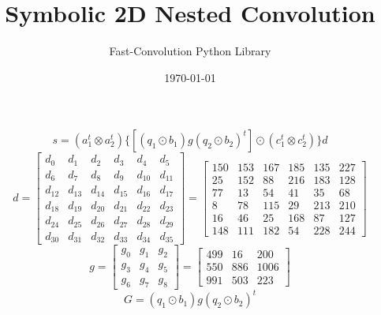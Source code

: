 \documentclass{article}%
\title{Symbolic 2D Nested Convolution}%
\author{Fast{-}Convolution Python Library}%
\date{\today}%
\begin{document}
%
\normalsize%
\maketitle%
\[%
s=(a_1^t \otimes a_2^t) \{[(q_1 \odot b_1) g (q_2 \odot b_2)^t] \odot (c_1^t \otimes c_2^t)\} d%
\]%
\[%
d = \left[\begin{matrix}d_{0} & d_{1} & d_{2} & d_{3} & d_{4} & d_{5}\\d_{6} & d_{7} & d_{8} & d_{9} & d_{10} & d_{11}\\d_{12} & d_{13} & d_{14} & d_{15} & d_{16} & d_{17}\\d_{18} & d_{19} & d_{20} & d_{21} & d_{22} & d_{23}\\d_{24} & d_{25} & d_{26} & d_{27} & d_{28} & d_{29}\\d_{30} & d_{31} & d_{32} & d_{33} & d_{34} & d_{35}\end{matrix}\right] = \left[\begin{matrix}150 & 153 & 167 & 185 & 135 & 227\\25 & 152 & 88 & 216 & 183 & 128\\77 & 13 & 54 & 41 & 35 & 68\\8 & 78 & 115 & 29 & 213 & 210\\16 & 46 & 25 & 168 & 87 & 127\\148 & 111 & 182 & 54 & 228 & 244\end{matrix}\right]%
\]%
\[%
g = \left[\begin{matrix}g_{0} & g_{1} & g_{2}\\g_{3} & g_{4} & g_{5}\\g_{6} & g_{7} & g_{8}\end{matrix}\right] = \left[\begin{matrix}499 & 16 & 200\\550 & 886 & 1006\\991 & 503 & 223\end{matrix}\right]%
\]%
\[%
G = (q_1 \odot b_1) g (q_2 \odot b_2)^t%
\]%
\end{document}
